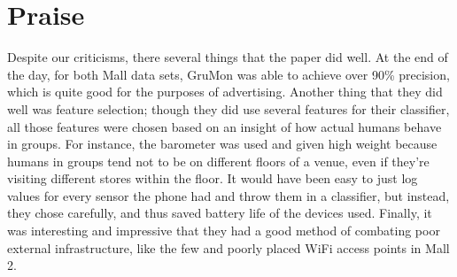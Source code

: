 \documentclass[12pt]{amsart}
\begin{document}
\section{\bf Praise}
Despite our criticisms, there several things that the paper did well. At the end
of the day, for both Mall data sets, GruMon was able to achieve over 90\%
precision, which is quite good for the purposes of advertising. Another thing
that they did well was feature selection; though they did use several features
for their classifier, all those features were chosen based on an insight of how
actual humans behave in groups. For instance, the barometer was used and given
high weight because humans in groups tend not to be on different floors of a
venue, even if they're visiting different stores within the floor. It would have
been easy to just log values for every sensor the phone had and throw them in a
classifier, but instead, they chose carefully, and thus saved battery life of
the devices used. Finally, it was interesting and impressive that they had a
good method of combating poor external infrastructure, like the few and poorly
placed WiFi access points in Mall 2.
\end{document}

